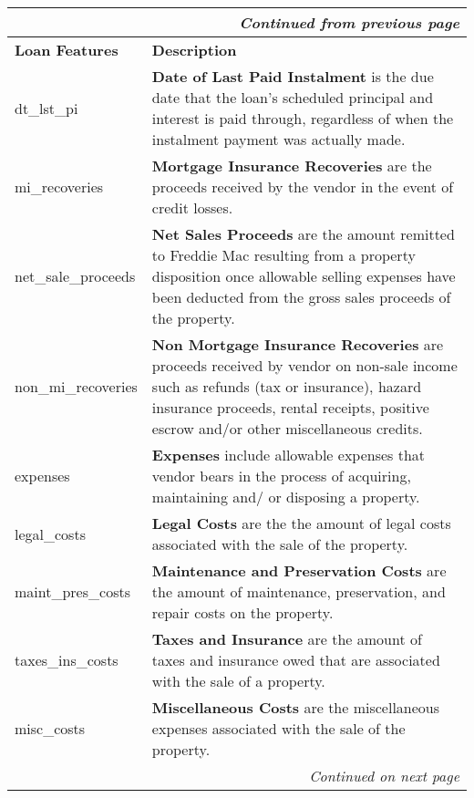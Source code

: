 \begin{appendices}
    
    \clearpage
    
    \begin{center}
        \centering
            \begin{tabular}{|p{4cm}|p{10cm}|}
                \multicolumn{2}{r}{\textit{Continued from previous page}} \\
                \hline \textbf{Loan Features} & \textbf{Description} \\ \hline \hline
                dt\_lst\_pi & \textbf{Date of Last Paid Instalment} is the due date that the loan’s scheduled principal and interest is paid through, regardless of when the instalment payment was actually made. \\ \hline  
                mi\_recoveries & \textbf{Mortgage Insurance Recoveries} are the proceeds received by the vendor in the event of credit losses.\\ \hline  
                net\_sale\_proceeds & \textbf{Net Sales Proceeds} are the amount remitted to Freddie Mac resulting from a property disposition once allowable selling expenses have been deducted from the gross sales proceeds of the property. \\ \hline  
                non\_mi\_recoveries & \textbf{Non Mortgage Insurance Recoveries} are proceeds received by vendor on non-sale income such as refunds (tax or insurance), hazard insurance proceeds, rental receipts, positive escrow and/or other miscellaneous credits.\\ \hline  
                expenses & \textbf{Expenses} include allowable expenses that vendor bears in the process of acquiring, maintaining and/ or disposing a property. \\ \hline  
                legal\_costs & \textbf{Legal Costs} are the the amount of legal costs associated with the sale of the property. \\ \hline  
                maint\_pres\_costs & \textbf{Maintenance and Preservation Costs} are the amount of maintenance, preservation, and repair costs on the property. \\ \hline  
                taxes\_ins\_costs & \textbf{Taxes and Insurance} are the amount of taxes and insurance owed that are associated with the sale of a property. \\ \hline  
                misc\_costs & \textbf{Miscellaneous Costs} are the miscellaneous expenses associated with the sale of the property. \\ \hline  
                
                \multicolumn{2}{r}{\textit{Continued on next page}} \\
            

\end{tabular}
\end{center}
\end{appendices}
